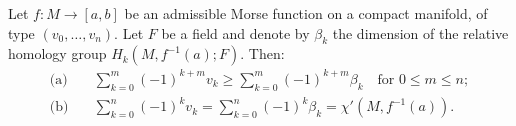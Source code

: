 Let $f: M \rightarrow [a,b]$ be an admissible Morse function on a compact manifold, of type $(v_0, \ldots, v_n)$. Let $F$ be a field and denote by $\beta_k$ the dimension of the relative homology group $H_k(M,f^{-1}(a);F)$. Then:
\begin{align*}
\text{(a)}\quad &\sum_{k=0}^{m} (-1)^{k+m} v_k \geqslant \sum_{k=0}^{m} (-1)^{k+m} \beta_k \quad \text{for } 0 \leqslant m \leqslant n; \\
\text{(b)}\quad &\sum_{k=0}^{n} (-1)^k v_k = \sum_{k=0}^{n} (-1)^k \beta_k = \chi'(M,f^{-1}(a)).
\end{align*}
